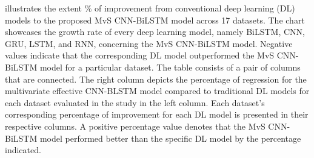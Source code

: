 \documentclass[a4paper, fleqn]{cas-sc}
\theoremstyle{definition}
\theoremstyle{remark}
\begin{document}
   illustrates the extent $\%$ of improvement from conventional deep learning (DL) models to the proposed MvS CNN-BiLSTM model across 17 datasets. The chart showcases the growth rate of every deep learning model,  namely BiLSTM,  CNN,  GRU,  LSTM,  and RNN, concerning the MvS CNN-BiLSTM model. Negative values indicate that the corresponding DL model outperformed the MvS CNN-BiLSTM model for a particular dataset. The table consists of a pair of columns that are connected. The right column depicts the percentage of regression for the multivariate effective CNN-BLSTM model compared to traditional DL models for each dataset evaluated in the study in the left column. Each dataset's corresponding percentage of improvement for each DL model is presented in their respective columns. A positive percentage value denotes that the MvS CNN-BiLSTM model performed better than the specific DL model by the percentage indicated.
\end{document}

